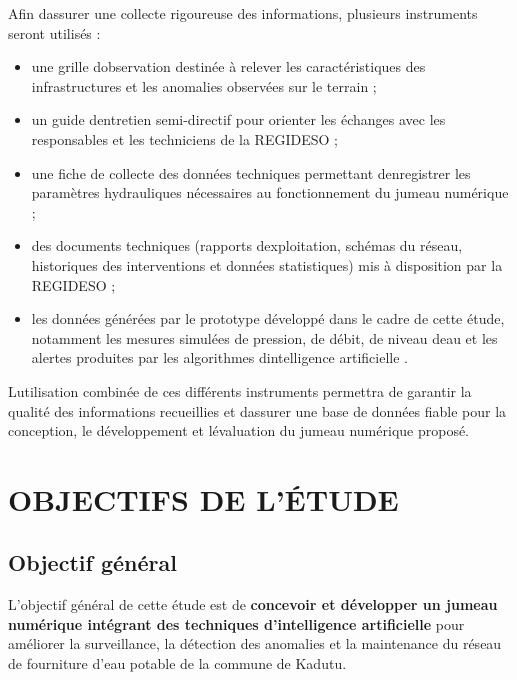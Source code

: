 Afin d\textquotesingle assurer une collecte rigoureuse des informations,
plusieurs instruments seront utilisés :

\begin{itemize}
	\item
	une grille d\textquotesingle observation destinée à relever les
	caractéristiques des infrastructures et les anomalies observées sur le
	terrain ;
	\item
	un guide d\textquotesingle entretien semi-directif pour orienter les
	échanges avec les responsables et les techniciens de la REGIDESO ;
	\item
	une fiche de collecte des données techniques permettant
	d\textquotesingle enregistrer les paramètres hydrauliques nécessaires
	au fonctionnement du jumeau numérique ;
	\item
	des documents techniques (rapports d\textquotesingle exploitation,
	schémas du réseau, historiques des interventions et données
	statistiques) mis à disposition par la REGIDESO ;
	\item
	les données générées par le prototype développé dans le cadre de cette
	étude, notamment les mesures simulées de pression, de débit, de niveau
	d\textquotesingle eau et les alertes produites par les algorithmes
	d\textquotesingle intelligence artificielle \cite{ref107}.
\end{itemize}

L\textquotesingle utilisation combinée de ces différents instruments
permettra de garantir la qualité des informations recueillies et
d\textquotesingle assurer une base de données fiable pour la conception,
le développement et l\textquotesingle évaluation du jumeau numérique
proposé.

\section{OBJECTIFS DE L'ÉTUDE}
\label{objectifs-de-letude}

\subsection{Objectif général}
\label{objectif-general}

L'objectif général de cette étude est de \textbf{concevoir et développer
	un jumeau numérique intégrant des techniques d'intelligence artificielle}
pour améliorer la surveillance, la détection des anomalies et la
maintenance du réseau de fourniture d'eau potable de la commune de
Kadutu.

